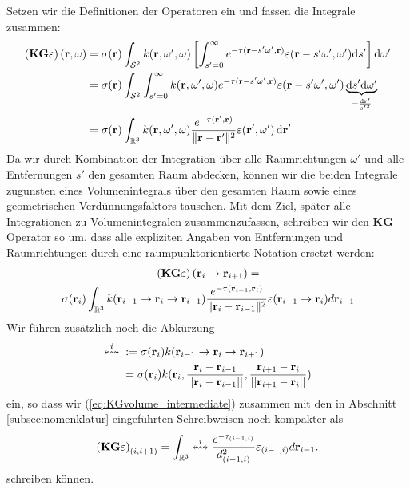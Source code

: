 	Setzen wir die Definitionen der Operatoren ein und fassen die Integrale zusammen:
	\begin{align*}
		\left(\mathbf{KG}\varepsilon\right)(\mathbf{r},\omega)&=\sigma(\mathbf{r}) \int_{\mathcal{S}^2} k(\mathbf{r},\omega',\omega)\left[\int_{s'=0}^\infty e^{-\tau(\mathbf{r}-s' \omega',\mathbf{r})}\varepsilon(\mathbf{r}-s' \omega',\omega') \text{d}s'\right] \text{d}\omega' \\
		&=\sigma(\mathbf{r}) \int_{\mathcal{S}^2} \int_{s'=0}^\infty k(\mathbf{r},\omega',\omega) e^{-\tau(\mathbf{r}-s' \omega',\mathbf{r})}\varepsilon(\mathbf{r}-s' \omega',\omega') \underbrace{\text{d}s' \text{d}\omega'}_{=\frac{\text{d}\mathbf{r}'}{s'^2}} \\
		&=\sigma(\mathbf{r}) \int_{\mathbb{R}^3} k(\mathbf{r},\omega',\omega) \frac{e^{-\tau(\mathbf{r}',\mathbf{r})}}{\|\mathbf{r}-\mathbf{r}'\|^2}\varepsilon(\mathbf{r}',\omega') \,\text{d}\mathbf{r}'
	\end{align*}
	Da wir durch Kombination der Integration über alle Raumrichtungen $\omega'$ und alle Entfernungen $s'$ den gesamten Raum abdecken, können wir die beiden Integrale zugunsten eines Volumenintegrals über den gesamten Raum sowie eines geometrischen Verdünnungsfaktors tauschen. Mit dem Ziel, später alle Integrationen zu Volumenintegralen zusammenzufassen, schreiben wir den $\mathbf{KG}$--Operator so um, dass alle expliziten Angaben von Entfernungen und Raumrichtungen durch eine raumpunktorientierte Notation ersetzt werden:
	\begin{multline}
		\left(\mathbf{KG}\varepsilon\right)(\mathbf{r}_i \rightarrow\mathbf{r}_{i+1})=\\
		\sigma(\mathbf{r}_i) \int_{\mathbb{R}^3} k(\mathbf{r}_{i-1}\rightarrow\mathbf{r}_i\rightarrow\mathbf{r}_{i+1})\frac{e^{-\tau(\mathbf{r}_{i-1},\mathbf{r}_i)}}{\|\mathbf{r}_i-\mathbf{r}_{i-1}\|^2}\varepsilon(\mathbf{r}_{i-1} \rightarrow\mathbf{r}_i)d\mathbf{r}_{i-1}
		\label{eq:KGvolume_intermediate}
	\end{multline}
	Wir führen zusätzlich noch die Abkürzung
	\begin{align*}
		\overset{i}{\leftrightsquigarrow}\;&:=\sigma(\mathbf{r}_i)k(\mathbf{r}_{i-1}\rightarrow\mathbf{r}_i\rightarrow\mathbf{r}_{i+1})\\
			&=\sigma(\mathbf{r}_i)k(\mathbf{r}_i,\frac{\mathbf{r}_i-\mathbf{r}_{i-1}}{||\mathbf{r}_i-\mathbf{r}_{i-1}||},\frac{\mathbf{r}_{i+1}-\mathbf{r}_i}{||\mathbf{r}_{i+1}-\mathbf{r}_i||})
	\end{align*}
	ein, so dass wir (\ref{eq:KGvolume_intermediate}) zusammen mit den in Abschnitt \ref{subsec:nomenklatur} eingeführten Schreibweisen noch kompakter als
	\begin{equation}
		\left(\mathbf{KG}\varepsilon\right)_{(i,i+1)}=\int_{\mathbb{R}^3} \overset{i}{\leftrightsquigarrow}\frac{e^{-\tau_{(i-1,i)}}}{d_{(i-1,i)}^2}\varepsilon_{(i-1,i)}d\mathbf{r}_{i-1}.
		\label{eq:KGvolume}
	\end{equation}
	schreiben können.


